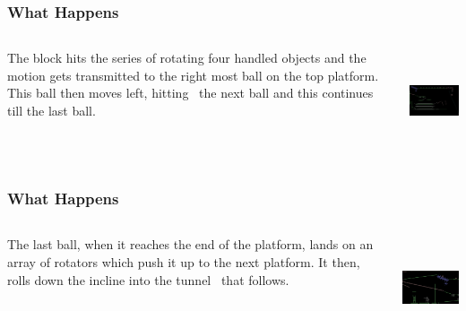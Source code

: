 \begin{frame}
\frametitle{What Happens}
\begin{columns}
\begin{column}{.7\textwidth}
\begin{scriptsize}
The block hits the series of rotating four handled objects and the motion gets transmitted to the right most ball on the top platform. This ball then moves left, hitting \
the next ball and this continues till the last ball.
\end{scriptsize}
\end{column}
\pause
\begin{column}{.4\textwidth}
\includegraphics[width=4.5cm,height=3cm]{wh45}
\end{column}
\end{columns}
\end{frame}

\begin{frame}
\frametitle{What Happens}
\begin{columns}
\begin{column}{.7\textwidth}
\begin{scriptsize}
The last ball, when it reaches the end of the platform, lands on an array of rotators which push it up to the next platform. It then, rolls down the incline into the tunnel \
that follows. 
\end{scriptsize}
\end{column}
\pause
\begin{column}{.4\textwidth}
\includegraphics[width=4.5cm,height=3cm]{wh5}
\end{column}
\end{columns}
\end{frame}

